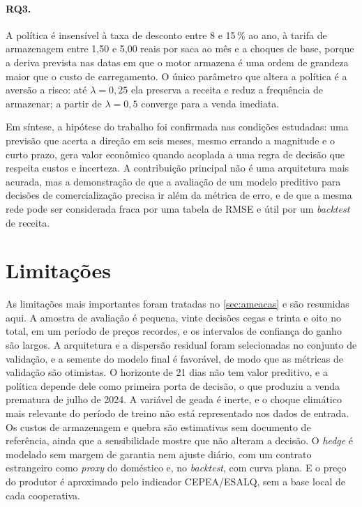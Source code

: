 \paragraph{RQ3.} A política é insensível à taxa de desconto entre 8 e 15\,\% ao ano, à tarifa de armazenagem entre 1,50 e 5,00 reais por saca ao mês e a choques de base, porque a deriva prevista nas datas em que o motor armazena é uma ordem de grandeza maior que o custo de carregamento. O único parâmetro que altera a política é a aversão a risco: até $\lambda = 0{,}25$ ela preserva a receita e reduz a frequência de armazenar; a partir de $\lambda = 0{,}5$ converge para a venda imediata.

Em síntese, a hipótese do trabalho foi confirmada nas condições estudadas: uma previsão que acerta a direção em seis meses, mesmo errando a magnitude e o curto prazo, gera valor econômico quando acoplada a uma regra de decisão que respeita custos e incerteza. A contribuição principal não é uma arquitetura mais acurada, mas a demonstração de que a avaliação de um modelo preditivo para decisões de comercialização precisa ir além da métrica de erro, e de que a mesma rede pode ser considerada fraca por uma tabela de RMSE e útil por um \textit{backtest} de receita.

\section{Limitações}

As limitações mais importantes foram tratadas no \autoref{sec:ameacas} e são resumidas aqui. A amostra de avaliação é pequena, vinte decisões cegas e trinta e oito no total, em um período de preços recordes, e os intervalos de confiança do ganho são largos. A arquitetura e a dispersão residual foram selecionadas no conjunto de validação, e a semente do modelo final é favorável, de modo que as métricas de validação são otimistas. O horizonte de 21 dias não tem valor preditivo, e a política depende dele como primeira porta de decisão, o que produziu a venda prematura de julho de 2024. A variável de geada é inerte, e o choque climático mais relevante do período de treino não está representado nos dados de entrada. Os custos de armazenagem e quebra são estimativas sem documento de referência, ainda que a sensibilidade mostre que não alteram a decisão. O \textit{hedge} é modelado sem margem de garantia nem ajuste diário, com um contrato estrangeiro como \textit{proxy} do doméstico e, no \textit{backtest}, com curva plana. E o preço do produtor é aproximado pelo indicador CEPEA/ESALQ, sem a base local de cada cooperativa.

